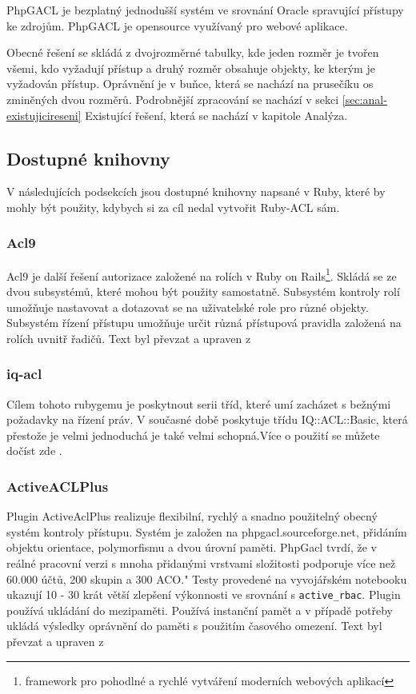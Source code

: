 PhpGACL je bezplatný jednodušší systém ve srovnání Oracle spravující přístupy ke zdrojům. PhpGACL je opensource využívaný pro webové aplikace.

Obecné řešení se skládá z dvojrozměrné tabulky, kde jeden rozměr je tvořen všemi, kdo vyžadují přístup a druhý rozměr obsahuje objekty, ke kterým je vyžadován přístup. Oprávnění je v buňce, která se nachází na prusečíku os zminěných dvou rozměrů.
Podrobnější zpracování se nachází v sekci \ref{sec:anal-existujicireseni} Existující řešení, která se nachází v kapitole Analýza.

\subsection{Dostupné knihovny}
V následujících podsekcích jsou dostupné knihovny napsané v Ruby, které by mohly být použity, kdybych si za cíl nedal vytvořit Ruby-ACL sám.

\subsubsection{Acl9}
Acl9 je další řešení autorizace založené na rolích v Ruby on Rails\footnote[3]{framework pro pohodlné a rychlé vytváření moderních webových aplikací}. Skládá se ze dvou subsystémů, které mohou být použity samostatně. Subsystém kontroly rolí umožňuje nastavovat a dotazovat se na uživatelské role pro různé objekty. 
Subsystém řízení přístupu umožňuje určit různá přístupová pravidla založená na rolích uvnitř řadičů. Text byl převzat a upraven z \cite{github:acl9}

\subsubsection{iq-acl}
Cílem tohoto rubygemu je poskytnout serii tříd, které umí zacházet s bežnými požadavky na řízení práv. V současné době poskytuje třídu IQ::ACL::Basic, která přestože je velmi jednoduchá je také velmi schopná.Více o použití se můžete dočíst zde \cite{github:iq-acl}.

\subsubsection{ActiveACLPlus}
Plugin ActiveAclPlus realizuje flexibilní, rychlý a snadno použitelný obecný systém kontroly přístupu.
Systém je založen na phpgacl.sourceforge.net, přidáním objektu orientace, polymorfismu a dvou úrovní paměti. PhpGacl tvrdí, že v reálné pracovní verzi s mnoha přidanými vrstvami složitosti podporuje více než 60.000 účtů, 200 skupin a 300 ACO." Testy provedené na vyvojářském notebooku ukazují 10 - 30 krát větší zlepšení výkonnosti ve srovnání s \verb|active_rbac|.
Plugin používá ukládání do mezipaměti. Používá instanční pamět a v případě potřeby ukládá výsledky oprávnění do paměti s použitím časového omezení. Text byl převzat a upraven z \cite{rubyforge:ActiveAclPlus}